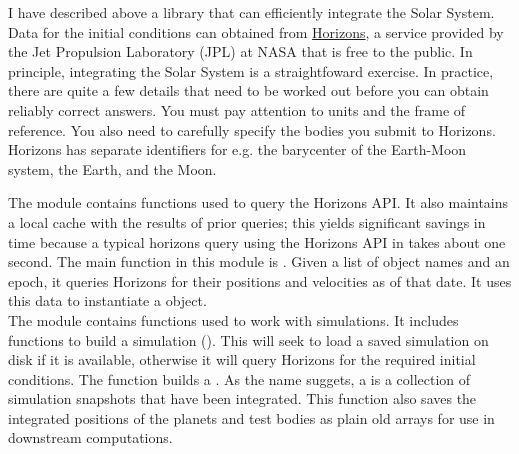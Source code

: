I have described above a library  that can efficiently integrate the Solar System.
Data for the initial conditions can obtained from \href{https://ssd.jpl.nasa.gov/?horizons}{Horizons},
a service provided by the Jet Propulsion Laboratory (JPL) at NASA that is free to the public.
In principle, integrating the Solar System is a straightfoward exercise.
In practice, there are quite a few details that need to be worked out before you can obtain reliably correct answers.
You must pay attention to units and the frame of reference.
You also need to carefully specify the bodies you submit to Horizons.
Horizons has separate identifiers for e.g. the barycenter of the Earth-Moon system, the Earth, and the Moon.

The module  contains functions used to query the Horizons API.
It also maintains a local cache with the results of prior queries; 
this yields significant savings in time because a typical horizons query using the Horizons API in  takes about one second.
The main function in this module is .
Given a list of object names and an epoch, it queries Horizons for their positions and velocities as of that date.
It uses this data to instantiate a  object. \\
The module  contains functions used to work with  simulations.
It includes functions to build a simulation ().
This will seek to load a saved simulation on disk if it is available, otherwise it will query Horizons for the required initial conditions.
The function  builds a .
As the name suggets, a  is a collection of simulation snapshots that  have been integrated.
This function also saves the integrated positions of the planets and test bodies as plain old  arrays for use in downstream computations.

